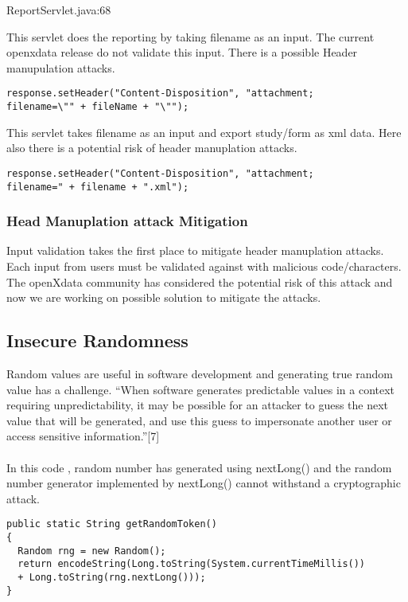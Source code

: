 \documentclass[11pt,a4paper]{article}
\theoremstyle{definition}
\begin{document}
ReportServlet.java:68

This servlet does the reporting by taking filename as an input. The current openxdata release do not validate this input. There is a possible Header manupulation attacks.

\begin{lstlisting}[caption= StudyExportServlet.java:95]
response.setHeader("Content-Disposition", "attachment; 
filename=\"" + fileName + "\"");
\end{lstlisting} 
 
 
This servlet takes filename as an input and export study/form as xml data. Here also there is a potential risk of header manuplation attacks.
  
\begin{lstlisting}
response.setHeader("Content-Disposition", "attachment; 
filename=" + filename + ".xml");
\end{lstlisting} 
 
\subsubsection {Head Manuplation attack Mitigation}
 
Input validation takes the first place to mitigate header manuplation attacks. Each input from users must be validated against with malicious code/characters. The openXdata community has considered the potential risk of this attack and now we are working on possible solution to mitigate the attacks. 

\subsection{Insecure Randomness}

Random values are useful in software development and generating true random value has a challenge. “When software generates predictable values in a context requiring unpredictability, it may be possible for an attacker to guess the next value that will be generated, and use this guess to impersonate another user or access sensitive information.”[7]\\\\


In this code , random number has generated using nextLong() and the random number generator implemented by nextLong() cannot withstand a cryptographic attack. 
\begin{lstlisting}[caption=openXdataSecurityUtil.java:175]
public static String getRandomToken() 
{
  Random rng = new Random();
  return encodeString(Long.toString(System.currentTimeMillis()) 
  + Long.toString(rng.nextLong()));
}
\end{lstlisting}
\end{document}
